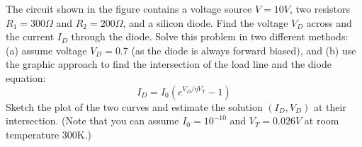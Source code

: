 \begin{enumerate}

\end{enumerate}


\item The circuit shown in the figure contains a voltage source $V=10V$,
two resistors $R_1=300\Omega$ and $R_2=200\Omega$, and a silicon diode.
Find the voltage $V_D$ across and the current $I_D$ through the diode.
Solve this problem in two different methods: (a) assume voltage $V_D=0.7$ 
(as the diode is always forward biased), and (b) use the graphic approach
to find the intersection of the load line and the diode equation:
\[ I_D=I_0 ( e^{V_D/\eta V_T}-1 ) \]
Sketch the plot of the two curves and estimate the solution $(I_D,V_D)$
at their intersection. (Note that you can assume $I_0=10^{-10}$ and 
$V_T=0.026V$ at room temperature 300K.)



